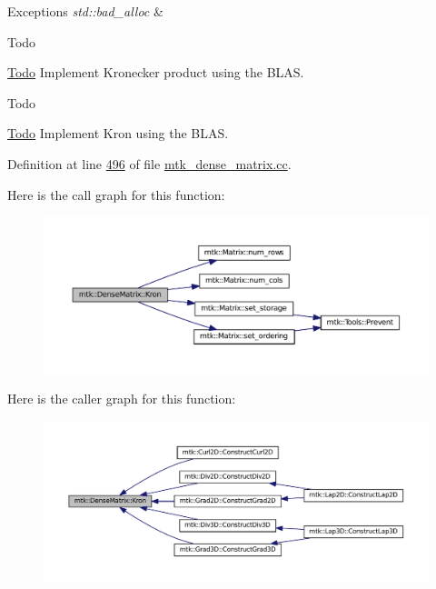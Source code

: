 \begin{DoxyExceptions}{Exceptions}
{\em std\+::bad\+\_\+alloc} & \\
\hline
\end{DoxyExceptions}
\begin{DoxyRefDesc}{Todo}
\item[\hyperlink{todo__todo000001}{Todo}]Implement Kronecker product using the B\+L\+A\+S. \end{DoxyRefDesc}
\begin{DoxyRefDesc}{Todo}
\item[\hyperlink{todo__todo000019}{Todo}]Implement Kron using the B\+L\+A\+S. \end{DoxyRefDesc}


Definition at line \hyperlink{mtk__dense__matrix_8cc_source_l00496}{496} of file \hyperlink{mtk__dense__matrix_8cc_source}{mtk\+\_\+dense\+\_\+matrix.\+cc}.



Here is the call graph for this function\+:\nopagebreak
\begin{figure}[H]
\begin{center}
\leavevmode
\includegraphics[width=350pt]{classmtk_1_1DenseMatrix_a01d3d8bd502870f93bf3a88a0cc5fb49_cgraph}
\end{center}
\end{figure}




Here is the caller graph for this function\+:\nopagebreak
\begin{figure}[H]
\begin{center}
\leavevmode
\includegraphics[width=350pt]{classmtk_1_1DenseMatrix_a01d3d8bd502870f93bf3a88a0cc5fb49_icgraph}
\end{center}
\end{figure}


